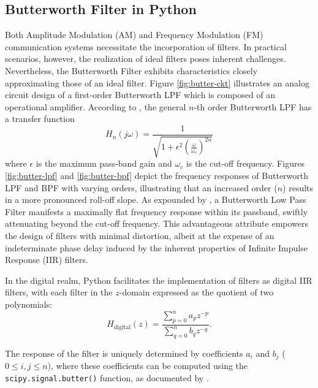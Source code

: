 \documentclass[../ECE459FinalProjectReport.tex]{subfiles}
\begin{document}
\subsection{Butterworth Filter in Python}

Both Amplitude Modulation (AM) and Frequency Modulation (FM) communication systems necessitate the incorporation of filters. In practical scenarios, however, the realization of ideal filters poses inherent challenges. Nevertheless, the Butterworth Filter exhibits characteristics closely approximating those of an ideal filter. Figure \ref{fig:butter-ckt} illustrates an analog circuit design of a first-order Butterworth LPF which is composed of an operational amplifier. According to \cite{ButterworthFilterWhat2021}, the general $n$-th order Butterworth LPF has a transfer function
\begin{equation}
    H_{n}\left( j\omega \right) =\frac{1}{\sqrt{1+\epsilon ^2\left( \frac{\omega}{\omega _c} \right) ^{2n}}}
\end{equation}
where $\epsilon$ is the maximum pass-band gain and $\omega_c$ is the cut-off frequency. Figures \ref{fig:butter-lpf} and \ref{fig:butter-bpf} depict the frequency responses of Butterworth LPF and BPF with varying orders, illustrating that an increased order ($n$) results in a more pronounced roll-off slope. As expounded by \cite{storrButterworthFilterDesign2013, kudekiAnalogSignalsSystems2009}, a Butterworth Low Pass Filter manifests a maximally flat frequency response within its passband, swiftly attenuating beyond the cut-off frequency. This advantageous attribute empowers the design of filters with minimal distortion, albeit at the expense of an indeterminate phase delay induced by the inherent properties of Infinite Impulse Response (IIR) filters.

In the digital realm, Python facilitates the implementation of filters as digital IIR filters, with each filter in the $z$-domain expressed as the quotient of two polynomials:
\begin{equation}
    H_{\text{digital}}(z) = \frac{\sum_{p=0}^{n}{a_pz^{-p}}}{\sum_{q=0}^{n}{b_qz^{-q}}}.
\end{equation}

The response of the filter is uniquely determined by coefficients $a_i$ and $b_j$ ($0 \leq i, j \leq n$), where these coefficients can be computed using the \verb|scipy.signal.butter()| function, as documented by \cite{thescipycommunityScipySignalButter, thescipycommunityScipySignalFiltfilt, thescipycommunityScipySignalLfilter}.
\end{document}
